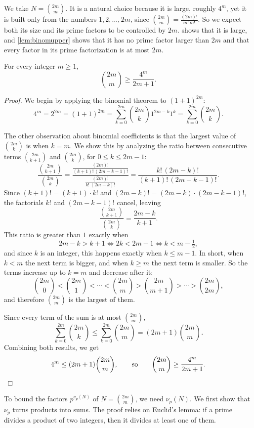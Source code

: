 \documentclass{article}
\begin{document}
We take $N = \binom{2m}{m}$. It is a natural choice because it is large, roughly $4^m$, yet it is built only from the
numbers $1, 2, \ldots, 2m$, since $\binom{2m}{m} = \frac{(2m)!}{m!\,m!}$. So we expect both its size and its prime
factors to be controlled by $2m$.  shows that it is large, and \cref{lem:binomupper} shows that it
has no prime factor larger than $2m$ and that every factor in its prime factorization is at most $2m$.

\begin{lemma}\label{lem:binomlower}
  For every integer $m \ge 1$,
  \[
    \binom{2m}{m} \ge \frac{4^m}{2m + 1}.
  \]
\end{lemma}
\begin{proof}
  We begin by applying the binomial theorem to ${(1 + 1)}^{2m}$:
  \[
    4^m = 2^{2m} = {(1 + 1)}^{2m} = \sum_{k=0}^{2m} \binom{2m}{k} 1^{2m-k} 1^k = \sum_{k=0}^{2m} \binom{2m}{k}.
  \]

  The other observation about binomial coefficients is that the largest value of $\binom{2m}{k}$ is when $k = m$. We
  show this by analyzing the ratio between consecutive terms $\binom{2m}{k+1}$ and $\binom{2m}{k}$, for
  $0 \le k \le 2m - 1$:
  \[
    \frac{\binom{2m}{k+1}}{\binom{2m}{k}}
      = \frac{\frac{(2m)!}{(k+1)!\,(2m-k-1)!}}{\frac{(2m)!}{k!\,(2m-k)!}}
      = \frac{k!\,(2m-k)!}{(k+1)!\,(2m-k-1)!}.
  \]
  Since $(k+1)! = (k+1) \cdot k!$ and $(2m-k)! = (2m-k) \cdot (2m-k-1)!$, the factorials $k!$ and $(2m-k-1)!$ cancel,
  leaving
  \[
    \frac{\binom{2m}{k+1}}{\binom{2m}{k}} = \frac{2m - k}{k + 1}.
  \]
  This ratio is greater than $1$ exactly when
  \[
    2m - k > k + 1 \iff 2k < 2m - 1 \iff k < m - \tfrac{1}{2},
  \]
  and since $k$ is an integer, this happens exactly when $k \le m - 1$. In short, when $k < m$ the next term is bigger,
  and when $k \ge m$ the next term is smaller. So the terms increase up to $k = m$ and decrease after it:
  \[
    \binom{2m}{0} < \binom{2m}{1} < \cdots < \binom{2m}{m} > \binom{2m}{m+1} > \cdots > \binom{2m}{2m},
  \]
  and therefore $\binom{2m}{m}$ is the largest of them.

  Since every term of the sum is at most $\binom{2m}{m}$,
  \[
    \sum_{k=0}^{2m} \binom{2m}{k} \le \sum_{k=0}^{2m} \binom{2m}{m} = (2m + 1) \binom{2m}{m}.
  \]
  Combining both results, we get
  \[
    4^m \le (2m + 1) \binom{2m}{m}, \qquad\text{so}\qquad \binom{2m}{m} \ge \frac{4^m}{2m + 1}. \qedhere
  \]
\end{proof}

To bound the factors $p^{\nu_p(N)}$ of $N = \binom{2m}{m}$, we need $\nu_p(N)$. We first show that $\nu_p$ turns
products into sums. The proof relies on Euclid's lemma: if a prime divides a product of two integers, then it divides at
least one of them.
\end{document}
